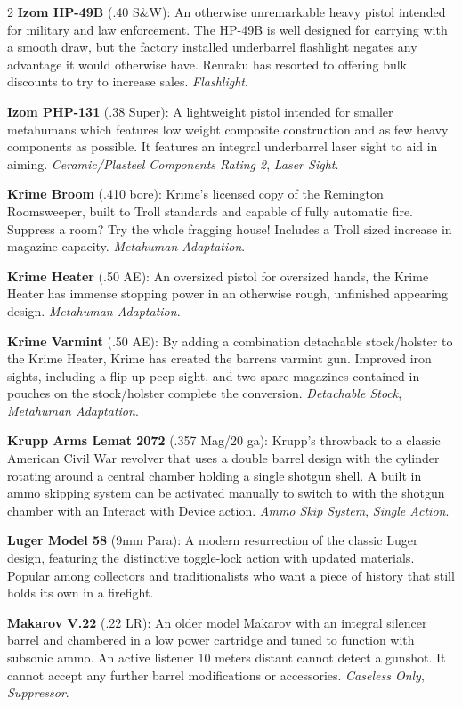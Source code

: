 \documentclass[
  oneside]{article}
\begin{document}
\begin{multicols}{2}
\textbf{Izom HP-49B} (.40 S\&W): An otherwise
unremarkable heavy pistol intended for military
and law enforcement. The HP-49B is well designed
for carrying with a smooth draw, but the factory
installed underbarrel flashlight negates any
advantage it would otherwise have. Renraku has
resorted to offering bulk discounts to try to
increase sales. \emph{Flashlight}.

\textbf{Izom PHP-131} (.38 Super): A lightweight
pistol intended for smaller metahumans which
features low weight composite construction and as
few heavy components as possible. It features an
integral underbarrel laser sight to aid in aiming.
\emph{Ceramic/Plasteel Components Rating 2},
\emph{Laser Sight}.

\textbf{Krime Broom} (.410 bore): Krime's licensed
copy of the Remington Roomsweeper, built to Troll
standards and capable of fully automatic fire.
Suppress a room? Try the whole fragging house!
Includes a Troll sized increase in magazine
capacity. \emph{Metahuman Adaptation}.

\textbf{Krime Heater} (.50 AE): An oversized
pistol for oversized hands, the Krime Heater has
immense stopping power in an otherwise rough,
unfinished appearing design. \emph{Metahuman
Adaptation}.

\textbf{Krime Varmint} (.50 AE): By adding a
combination detachable stock/holster to the Krime
Heater, Krime has created the barrens varmint gun.
Improved iron sights, including a flip up peep
sight, and two spare magazines contained in
pouches on the stock/holster complete the
conversion. \emph{Detachable Stock},
\emph{Metahuman Adaptation}.

\textbf{Krupp Arms Lemat 2072} (.357 Mag/20 ga):
Krupp's throwback to a classic American Civil War
revolver that uses a double barrel design with the
cylinder rotating around a central chamber holding
a single shotgun shell. A built in ammo skipping
system can be activated manually to switch to with
the shotgun chamber with an Interact with Device
action. \emph{Ammo Skip System}, \emph{Single
Action}.

\textbf{Luger Model 58} (9mm Para): A modern
resurrection of the classic Luger design,
featuring the distinctive toggle-lock action with
updated materials. Popular among collectors and
traditionalists who want a piece of history that
still holds its own in a firefight.

\textbf{Makarov V.22} (.22 LR): An older model
Makarov with an integral silencer barrel and
chambered in a low power cartridge and tuned to
function with subsonic ammo. An active listener 10
meters distant cannot detect a gunshot. It cannot
accept any further barrel modifications or
accessories. \emph{Caseless Only},
\emph{Suppressor}.


\end{multicols}
\end{document}
